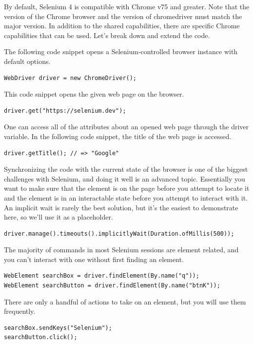 By default, Selenium 4 is compatible with Chrome v75 and greater. Note that the version of the Chrome browser and the version of chromedriver must match the major version. In addition to the shared capabilities, there are specific Chrome capabilities that can be used. Let's break down and extend the code.

The following code snippet opens a Selenium-controlled browser instance with default options.
\begin{lstlisting}
WebDriver driver = new ChromeDriver();
\end{lstlisting}

This code snippet opens the given web page on the browser.
\begin{lstlisting}
driver.get("https://selenium.dev");
\end{lstlisting}

One can access all of the attributes about an opened web page through the driver variable. In the following code snippet, the title of the web page is accessed.
\begin{lstlisting}
driver.getTitle(); // => "Google"
\end{lstlisting}

Synchronizing the code with the current state of the browser is one of the biggest challenges with Selenium, and doing it well is an advanced topic. Essentially you want to make sure that the element is on the page before you attempt to locate it and the element is in an interactable state before you attempt to interact with it. An implicit wait is rarely the best solution, but it’s the easiest to demonstrate here, so we’ll use it as a placeholder.
\begin{lstlisting}
driver.manage().timeouts().implicitlyWait(Duration.ofMillis(500));
\end{lstlisting}

The majority of commands in most Selenium sessions are element related, and you can’t interact with one without first finding an element.
\begin{lstlisting}
WebElement searchBox = driver.findElement(By.name("q"));
WebElement searchButton = driver.findElement(By.name("btnK"));
\end{lstlisting}

There are only a handful of actions to take on an element, but you will use them frequently.
\begin{lstlisting}
searchBox.sendKeys("Selenium");
searchButton.click();
\end{lstlisting}

